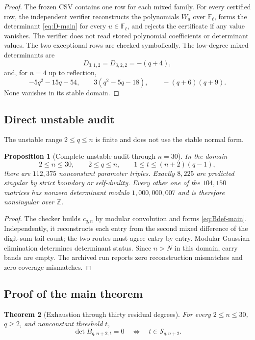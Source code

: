 \documentclass[11pt]{amsart}
\newcommand{\Z}{\mathbb Z}
\newcommand{\F}{\mathbb F}
\newcommand{\Sing}{\mathcal S}
\newcommand{\1}{\mathbf 1}
\newtheorem{theorem}{Theorem}[section]
\newtheorem{proposition}[theorem]{Proposition}
\theoremstyle{remark}
\begin{document}
\begin{proof}
The frozen CSV contains one row for each mixed family. For every certified row, the independent verifier reconstructs the polynomials $W_a$ over $\F_\ell$, forms the determinant \eqref{eq:D-main} for every $u\in\F_\ell$, and rejects the certificate if any value vanishes. The verifier does not read stored polynomial coefficients or determinant values. The two exceptional rows are checked symbolically. The low-degree mixed determinants are
\[
 D_{3,1,2}=D_{3,2,2}=-(q+4),
\]
and, for $n=4$ up to reflection,
\[
 -5q^2-15q-54,\qquad3(q^2-5q-18),\qquad-(q+6)(q+9).
\]
None vanishes in its stable domain.
\end{proof}

\subsection{Direct unstable audit}
The unstable range $2\le q\le n$ is finite and does not use the stable normal form.

\begin{proposition}[Complete unstable audit through $n=30$]\label{prop:unstable-main}
In the domain
\[
 2\le n\le30,\qquad2\le q\le n,
 \qquad1\le t\le(n+2)(q-1),
\]
there are $112{,}375$ nonconstant parameter triples. Exactly $8{,}225$ are predicted singular by strict boundary or self-duality. Every other one of the $104{,}150$ matrices has nonzero determinant modulo $1{,}000{,}000{,}007$ and is therefore nonsingular over $\Z$.
\end{proposition}

\begin{proof}
The checker builds $c_{q,n}$ by modular convolution and forms \eqref{eq:Bdef-main}. Independently, it reconstructs each entry from the second mixed difference of the digit-sum tail count; the two routes must agree entry by entry. Modular Gaussian elimination determines determinant status. Since $n>N$ in this domain, carry bands are empty. The archived run reports zero reconstruction mismatches and zero coverage mismatches.
\end{proof}



\subsection{Proof of the main theorem}
\begin{theorem}[Exhaustion through thirty residual degrees]\label{thm:exhaustion-main}
For every $2\le n\le30$, $q\ge2$, and nonconstant threshold $t$,
\[
 \det B_{q,n+2,t}=0\quad\Longleftrightarrow\quad t\in\Sing_{q,n+2}.
\]
\end{theorem}
\end{document}
